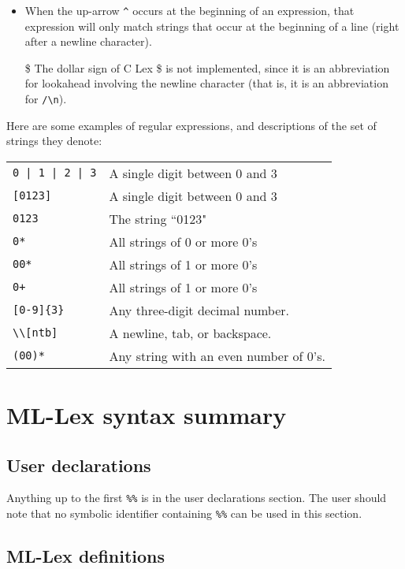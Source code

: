 \begin{itemize}
\item   When the up-arrow \verb|^| occurs at the beginning of an expression,
        that expression will only match strings that occur at the
        beginning of a line (right after a newline character).

\item[\$]   The dollar sign of C Lex \$ is not implemented, since it is an abbreviation
        for lookahead involving the newline character (that is, it
        is an abbreviation for \verb|/\n|).
\end{itemize}

Here are some examples of regular expressions, and descriptions of the
set of strings they denote:

\begin{tabular}{ll}
\verb~0 | 1 | 2 | 3~&           A single digit between 0 and 3\\
\verb|[0123]|&                  A single digit between 0 and 3\\
\verb|0123|&                    The string ``0123"\\
\verb|0*|&                      All strings of 0 or more 0's\\
\verb|00*|&                     All strings of 1  or more 0's\\
\verb|0+|&                      All strings of 1  or more 0's\\
\verb|[0-9]{3}|&                Any three-digit decimal number.\\
\verb|\\[ntb]|&                 A newline, tab, or backspace.\\
\verb|(00)*|& Any string with an even number of 0's.
\end{tabular}

\section{ML-Lex syntax summary}

\subsection{User declarations}

Anything up to the first \verb|%%| is in the user declarations section.  The
user should note that no symbolic identifier containing
\verb|%%| can be
used in this section.

\subsection{ML-Lex definitions}

